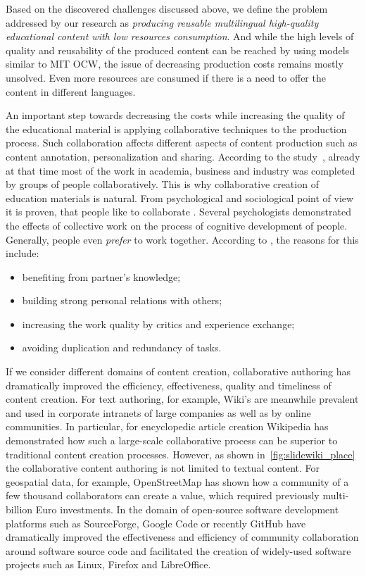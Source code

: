 \documentclass[ngerman,UKenglish,table]{scrbook}
\begin{document}
Based on the discovered challenges discussed above, we define the problem addressed by our research as \emph{producing reusable multilingual high-quality educational content with low resources consumption}.
And while the high levels of quality and reusability of the produced content can be reached by using models similar to MIT OCW, the issue of decreasing production costs remains mostly unsolved.
Even more resources are consumed if there is a need to offer the content in different languages.

An important step towards decreasing the costs while increasing the quality of the educational material is applying collaborative techniques to the production process.
Such collaboration affects different aspects of content production such as content annotation, personalization and sharing.
According to the study~\cite{posner1992people}, already at that time most of the work in academia, business and industry was completed by groups of people collaboratively.
This is why collaborative creation of education materials is natural.
From psychological and sociological point of view it is proven, that people like to collaborate \cite{smith1995cooperative, Halimi2011}.
Several psychologists demonstrated the effects of collective work on the process of cognitive development of people.
Generally, people even \emph{prefer} to work together. 
According to \cite{smith1995cooperative, Halimi2011}, the reasons for this include:

\begin{itemize}
\item benefiting from partner's knowledge;
\item building strong personal relations with others;
\item increasing the work quality by critics and experience exchange;
\item avoiding duplication and redundancy of tasks.
\end{itemize}

If we consider different domains of content creation, collaborative authoring has dramatically improved the efficiency, effectiveness, quality and timeliness of content creation.
For text authoring, for example, Wiki’s are meanwhile prevalent and used in corporate intranets of large companies as well as by online communities.
In particular, for encyclopedic article creation Wikipedia has demonstrated how such a large-scale collaborative process can be superior to traditional content creation processes.
However, as shown in~\autoref{fig:slidewiki_place} the collaborative content authoring is not limited to textual content.
For geospatial data, for example, OpenStreetMap has shown how a community of a few thousand collaborators can create a value, which required previously multi-billion Euro investments.
In the domain of open-source software development platforms such as SourceForge, Google Code or recently GitHub have dramatically improved the effectiveness and efficiency of community collaboration around software source code and facilitated the creation of widely-used software projects such as Linux, Firefox and LibreOffice.
\end{document}
